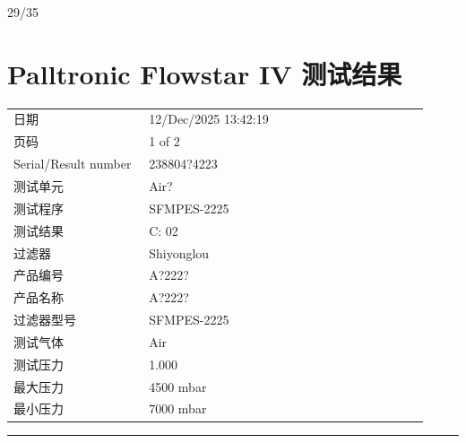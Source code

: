 \documentclass[UTF8,10pt,a4paper,fontset=fandol]{ctexart}
\newcommand{\fieldvalue}[1]{#1}
\newcommand{\handwritten}[1]{#1}
\begin{document}
\vfill

\handwritten{29/35}

\newpage

\section{Palltronic Flowstar IV 测试结果}

\begin{tabular}{@{}p{0.30\linewidth}p{0.62\linewidth}@{}}
日期 &
\fieldvalue{12/Dec/2025 13:42:19} \\[2pt]
页码 &
\fieldvalue{1 of 2} \\[2pt]
Serial/Result number &
\fieldvalue{238804?4223} \\[2pt]
测试单元 &
\fieldvalue{Air?} \\[2pt]
测试程序 &
\fieldvalue{SFMPES-2225} \\[2pt]
测试结果 &
\fieldvalue{C: 02} \\[2pt]
过滤器 &
\fieldvalue{Shiyonglou} \\[2pt]
产品编号 &
\fieldvalue{A?222?} \\[2pt]
产品名称 &
\fieldvalue{A?222?} \\[2pt]
过滤器型号 &
\fieldvalue{SFMPES-2225} \\[2pt]
测试气体 &
\fieldvalue{Air} \\[2pt]
测试压力 &
\fieldvalue{1.000} \\[2pt]
最大压力 &
\fieldvalue{4500 mbar} \\[2pt]
最小压力 &
\fieldvalue{7000 mbar}
\end{tabular}

\medskip
\noindent\rule{\linewidth}{0.4pt}
\end{document}
